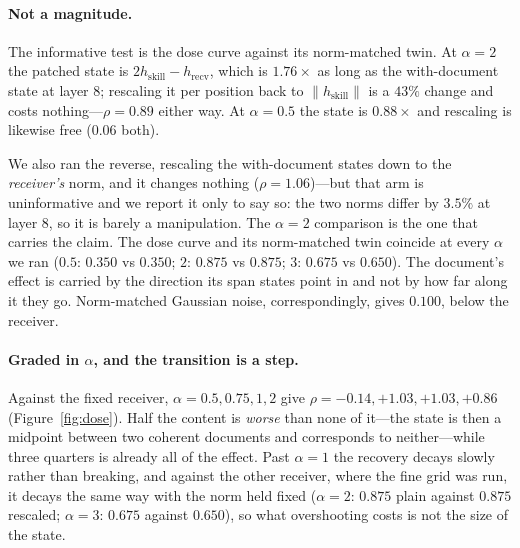 \documentclass{article}
\begin{document}
\paragraph{Not a magnitude.} The informative test is the dose curve against its
norm-matched twin. At $\alpha = 2$ the patched state is $2h_{\text{skill}} -
h_{\text{recv}}$, which is $1.76\times$ as long as the with-document state at
layer 8; rescaling it per position back to $\|h_{\text{skill}}\|$ is a $43\%$
change and costs nothing---$\rho = 0.89$ either way. At $\alpha = 0.5$ the state
is $0.88\times$ and rescaling is likewise free ($0.06$ both).

We also ran the reverse, rescaling the with-document states down to the
\emph{receiver's} norm, and it changes nothing ($\rho = 1.06$)---but that arm is
uninformative and we report it only to say so: the two norms differ by $3.5\%$ at
layer 8, so it is barely a manipulation. The $\alpha = 2$ comparison is the one
that carries the claim. The dose curve and its norm-matched twin coincide
at every $\alpha$ we ran ($0.5$: $0.350$ vs $0.350$; $2$: $0.875$ vs $0.875$;
$3$: $0.675$ vs $0.650$). The document's effect is carried by the direction its
span states point in and not by how far along it they go. Norm-matched Gaussian
noise, correspondingly, gives $0.100$, below the receiver.

\paragraph{Graded in $\alpha$, and the transition is a step.} Against the fixed
receiver, $\alpha = 0.5, 0.75, 1, 2$ give $\rho = -0.14, +1.03, +1.03, +0.86$
(Figure~\ref{fig:dose}). Half the content is \emph{worse} than none of it---the
state is then a midpoint between two coherent documents and corresponds to
neither---while three quarters is already all of the effect. Past $\alpha=1$ the
recovery decays slowly rather than breaking, and against the other receiver,
where the fine grid was run, it decays the same way with the norm held fixed
($\alpha=2$: $0.875$ plain against $0.875$ rescaled; $\alpha=3$: $0.675$ against
$0.650$), so what overshooting costs is not the size of the state.
\end{document}
